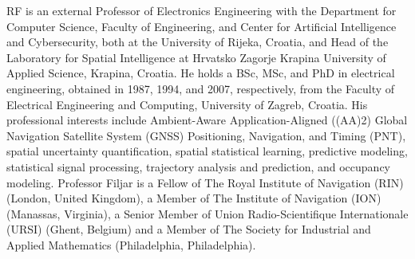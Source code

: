 \let\LaTeXcline\cline\documentclass[sn-mathphys-num]{sn-jnl}\let\cline\LaTeXcline
\begin{document}
RF is an external Professor of Electronics Engineering with the Department for Computer Science, Faculty of Engineering, and Center for Artificial Intelligence and Cybersecurity, both at the University of Rijeka, Croatia, and Head of the Laboratory for Spatial Intelligence at Hrvatsko Zagorje Krapina University of Applied Science, Krapina, Croatia. He holds a BSc, MSc, and PhD in electrical engineering, obtained in 1987, 1994, and 2007, respectively, from the Faculty of Electrical Engineering and Computing, University of Zagreb, Croatia. His professional interests include Ambient-Aware Application-Aligned ((AA)2) Global Navigation Satellite System (GNSS) Positioning, Navigation, and Timing (PNT), spatial uncertainty quantification, spatial statistical learning, predictive modeling, statistical signal processing, trajectory analysis and prediction, and occupancy modeling. Professor Filjar is a Fellow of The Royal Institute of Navigation (RIN) (London, United Kingdom), a Member of The Institute of Navigation (ION) (Manassas, Virginia), a Senior Member of Union Radio-Scientifique Internationale (URSI) (Ghent, Belgium) and a Member of The Society for Industrial and Applied Mathematics  (Philadelphia, Philadelphia).

\end{document}
